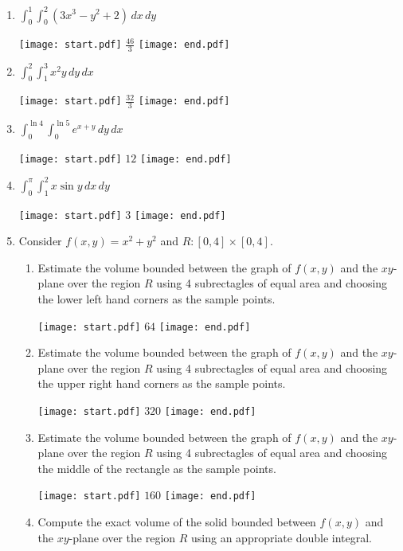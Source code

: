 \documentclass[12pt]{article}
\begin{document}
\begin{enumerate}

\item $\int_0^1\int_0^2\left(3x^3-y^2+2\right)\,dx\,dy$

\texttt{[image: start.pdf]}
{{$\frac{46}{3}$}}
\texttt{[image: end.pdf]}


\item $\int_0^2\int_1^3 x^2y\,dy\,dx$

\texttt{[image: start.pdf]}
{{$\frac{32}{3}$}}
\texttt{[image: end.pdf]}


\item $\int_0^{\ln{4}}\int_0^{\ln{5}}e^{x+y}\,dy\,dx$

\texttt{[image: start.pdf]}
{{$12$}}
\texttt{[image: end.pdf]}


\item $\int_0^{\pi} \int_1^2 x\sin{y} \,dx \,dy$

\texttt{[image: start.pdf]}
{{$3$}}
\texttt{[image: end.pdf]}


\item Consider $f(x,y)=x^2+y^2$ and $R:[0,4]\times[0,4]$.

\begin{enumerate}

\item Estimate the volume bounded between the graph of $f(x,y)$ and the $xy$-plane over the region $R$ using 4 subrectagles of equal area and choosing the lower left hand corners as the sample points.

\texttt{[image: start.pdf]}
{{$64$}}
\texttt{[image: end.pdf]}


\item Estimate the volume bounded between the graph of $f(x,y)$ and the $xy$-plane over the region $R$ using 4 subrectagles of equal area and choosing the upper right hand corners as the sample points.

\texttt{[image: start.pdf]}
{{$320$}}
\texttt{[image: end.pdf]}


\item Estimate the volume bounded between the graph of $f(x,y)$ and the $xy$-plane over the region $R$ using 4 subrectagles of equal area and choosing the middle of the rectangle as the sample points.

\texttt{[image: start.pdf]}
{{$160$}}
\texttt{[image: end.pdf]}


\item Compute the exact volume of the solid bounded between $f(x,y)$ and the $xy$-plane over the region $R$ using an appropriate double integral.


\end{enumerate}
\end{enumerate}
\end{document}
